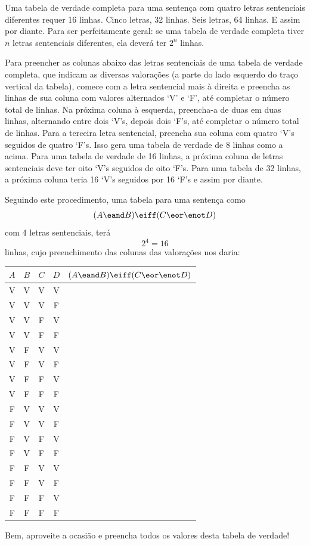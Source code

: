 Uma tabela de verdade completa para uma sentença com quatro letras sentenciais diferentes requer 16 linhas.
Cinco letras, 32 linhas.
Seis letras, 64 linhas.
E assim por diante.
Para ser perfeitamente geral: se uma tabela de verdade completa tiver $n$ letras sentenciais diferentes, ela deverá ter $2^n$ linhas.

Para preencher as colunas abaixo das letras sentenciais de uma tabela de verdade completa, que indicam as diversas valorações (a parte do lado esquerdo do traço vertical da tabela), comece com a letra sentencial mais à direita e preencha as linhas de sua coluna com valores alternados `V' e `F', até completar o número total de linhas.
Na próxima coluna à esquerda, preencha-a de duas em duas linhas, alternando entre dois `V's, depois dois `F's, até completar o número total de linhas.
Para a terceira letra sentencial, preencha sua coluna com quatro `V's seguidos de quatro `F's. Isso gera uma tabela de verdade de 8 linhas como a acima.
Para uma tabela de verdade de 16 linhas, a próxima coluna de letras sentenciais deve ter oito `V's seguidos de oito `F's.
Para uma tabela de 32 linhas, a próxima coluna teria 16 `V's seguidos por 16 `F's e assim por diante.

Seguindo este procedimento, uma tabela para uma sentença como
$$(A \eand B) \eiff (C \eor \enot D)$$
com 4 letras sentenciais, terá
$$2^4=16$$
linhas, cujo preenchimento das colunas das valorações nos daria:
\begin{center}
\begin{tabular}{c c c c|c}
$A$&$B$&$C$&$D$&$(A \eand B) \eiff (C \eor \enot D)$\\
\hline
V & V & V & V &  \\
V & V & V & F &  \\
V & V & F & V & \\
V & V & F & F & \\
V & F & V & V & \\
V & F & V & F & \\
V & F & F & V & \\
V & F & F & F & \\
F & V & V & V & \\
F & V & V & F & \\
F & V & F & V & \\
F & V & F & F & \\
F & F & V & V & \\
F & F & V & F & \\
F & F & F & V & \\
F & F & F & F & 
\end{tabular}
\end{center}
Bem, aproveite a ocasião e preencha todos os valores desta tabela de verdade!


